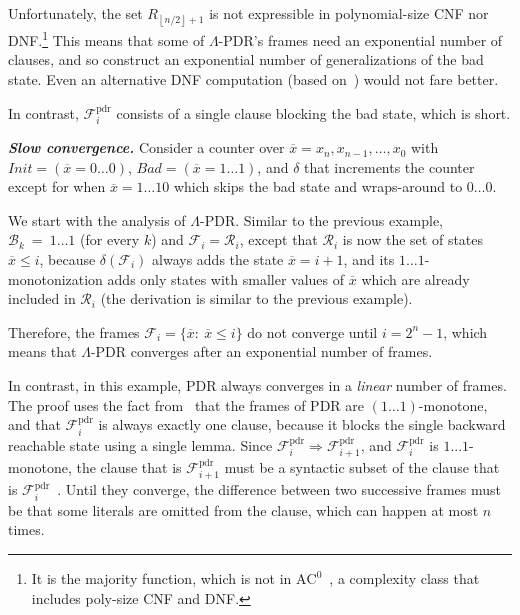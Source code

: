 \documentclass[acmsmall,screen]{acmart}
\newcommand{\para}[1]{\vspace{2pt}\noindent\textbf{\textit{#1.}}}
\newcommand{\ov}{\overline}
\renewcommand{\implies}{\Longrightarrow}
\newcommand{\Init}{{\textit{Init}}}
\newcommand{\Bad}{\textit{Bad}}
\newcommand{\tr}{\delta}
\newcommand{\Frame}{\mathcal{F}}
\newcommand{\Framepdr}{\mathcal{F}^{\text{pdr}}}
\renewcommand{\vec}{\ov}
\newcommand{\set}[1]{\{{#1}\}}
\newcommand{\bkwrch}[1]{\mathcal{B}_{#1}}
\begin{document}
Unfortunately, the set $R_{\left\lfloor{n/2}\right\rfloor+1}$ is not expressible in polynomial-size CNF nor DNF.\footnote{
	It is the majority function, which is not in $\mbox{AC}^0$~\cite{DBLP:conf/stoc/Hastad86}, a complexity class that includes poly-size CNF and DNF.
}
This means that some of $\Lambda$-PDR's frames need an exponential number of clauses, and so construct an exponential number of generalizations of the bad state. Even an alternative DNF computation (based on~) would not fare better.
%

In contrast, $\Framepdr_i$ consists of a single clause blocking the bad state, which is short.
%

\para{Slow convergence}
\label{sec:slow-convergence}
Consider a counter over $\vec{x}=x_n,x_{n-1},\ldots,x_0$ with $\Init = (\vec{x}=0\ldots0)$, $\Bad=(\vec{x}=1\ldots1)$, and $\tr$ that increments the counter except for when $\vec{x}=1\ldots10$ which skips the bad state and wraps-around to $0\ldots0$.

We start with the analysis of $\Lambda$-PDR. Similar to the previous example, $\bkwrch{k} \ = \ 1\ldots1$ (for every $k$) and $\Frame_i = \mathcal{R}_i$, except that $\mathcal{R}_i$ is now
%
%
the set of states $\vec{x} \leq i$, because $\tr(\Frame_i)$ always adds the state $\vec{x}=i+1$, and its $1\ldots1$-monotonization adds only states with smaller values of $\vec{x}$ which are already included in $\mathcal{R}_i$ (the derivation is similar to the previous example).
%
%
%
%
%

Therefore, the frames $\Frame_i = \set{\vec{x}: \ \vec{x} \leq i}$ do not converge until $i=2^n-1$, which means that $\Lambda$-PDR converges after an exponential number of frames.

In contrast, in this example, PDR always converges in a \emph{linear} number of frames.
The proof uses the fact from~ that the frames of PDR are $(1\ldots1)$-monotone, and that $\Framepdr_i$ is always exactly one clause, because it blocks the single backward reachable state using a single lemma. Since $\Framepdr_i \implies \Framepdr_{i+1}$, and $\Framepdr_i$ is $1...1$-monotone, the clause that is $\Framepdr_{i+1}$ must be a syntactic subset of the clause that is $\Framepdr_i$~\cite{quine1954two}. Until they converge, the difference between two successive frames must be that some literals are omitted from the clause, which can happen at most $n$ times.  
%
\end{document}

